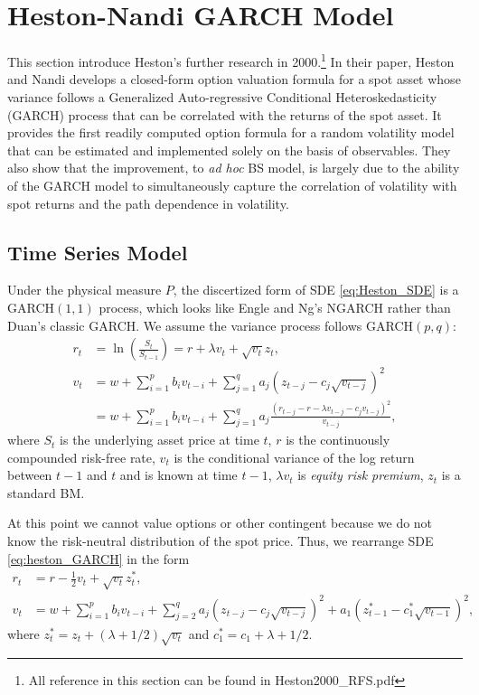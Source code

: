 \documentclass[a4paper,12pt]{article}
\numberwithin{equation}{section}
\theoremstyle{definition}
\theoremstyle{remark}
\begin{document}
\newpage
\section{Heston-Nandi GARCH Model}
This section introduce Heston's further research in 2000.\footnote{
All reference in this section can be found in Heston2000\_RFS.pdf} 
In their paper, Heston and Nandi develops a closed-form option 
valuation formula for a spot asset whose variance follows a 
Generalized Auto-regressive Conditional Heteroskedasticity (GARCH) 
process that can be correlated with the returns of the spot asset. 
It provides the first readily computed option formula for a random 
volatility model that can be estimated and implemented solely on 
the basis of observables. They also show that the improvement, 
to \textit{ad hoc} BS model, is largely due to the ability 
of the GARCH model to simultaneously capture the correlation of 
volatility with spot returns and the path dependence in volatility.

\subsection{Time Series Model}
Under the physical measure $P$, the discertized form of SDE 
\eqref{eq:Heston_SDE} is a GARCH$(1,1)$ process, which looks 
like Engle and Ng's NGARCH rather than Duan's classic 
GARCH. We assume the variance process follows GARCH$(p,q)$:
\begin{equation}
\label{eq:heston_GARCH}
\begin{split}
    r_{t}&=\ln\left(\frac{S_{t}}{S_{t-1}}\right)
    =r+\lambda v_{t}+\sqrt{v_{t}}z_{t}, \\
    v_{t}&=w+\sum_{i=1}^{p}b_{i}v_{t-i}
    +\sum_{j=1}^{q}a_{j}(z_{t-j}-c_{j}\sqrt{v_{t-j}})^{2} \\
    &=w+\sum_{i=1}^{p}b_{i}v_{t-i}+\sum_{j=1}^{q}a_{j}
    \frac{(r_{t-j}-r-\lambda v_{t-j}-c_{j}v_{t-j})^{2}}{v_{t-j}},
\end{split}
\end{equation}
where $S_{t}$ is the underlying asset price at time $t$, $r$ is 
the continuously compounded risk-free rate, $v_{t}$ is the 
conditional variance of the log return between $t-1$ and $t$ and 
is known at time $t-1$, $\lambda v_{t}$ is \textit{equity risk 
premium}, $z_{t}$ is a standard BM.

At this point we cannot value options or other contingent because 
we do not know the risk-neutral distribution of the spot price. 
Thus, we rearrange SDE \eqref{eq:heston_GARCH} in the form 
\begin{equation}\label{eq:heston_GARCH_emm}
    \begin{split}
        r_{t}&=r-\frac{1}{2}v_{t}+\sqrt{v_{t}}z^{*}_{t}, \\
        v_{t}&=w+\sum_{i=1}^{p}b_{i}v_{t-i}+\sum_{j=2}^{q}a_{j}
        (z_{t-j}-c_{j}\sqrt{v_{t-j}})^{2}+a_{1}(z^{*}_{t-1}-
        c^{*}_{1}\sqrt{v_{t-1}})^{2},
    \end{split}
\end{equation}
where $z^{*}_{t}=z_{t}+(\lambda+1/2)\sqrt{v_{t}}$ and 
$c_{1}^{*}=c_{1}+\lambda+1/2$.
\end{document}

